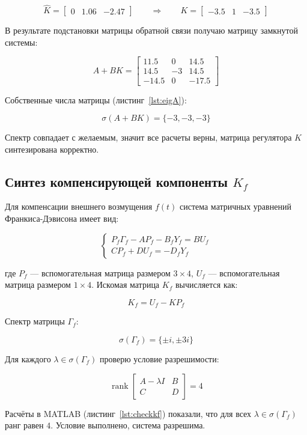 \documentclass[a4paper,12pt]{article}
\begin{document}
	\[
	\hat K =
	\begin{bmatrix}
		0 & 1.06 & -2.47
	\end{bmatrix}
	\qquad \Longrightarrow \qquad	
	K =
	\begin{bmatrix}
		-3.5 & 1 & -3.5
	\end{bmatrix}
	\]
	
	В результате подстановки матрицы обратной связи получаю матрицу замкнутой системы:
	
	\[
	A + BK =
	\begin{bmatrix}
		11.5 & 0 & 14.5 \\
		14.5 & -3 & 14.5 \\
		-14.5 & 0 & -17.5
	\end{bmatrix}
	\]
	
	Собственные числа матрицы (листинг~\ref{lst:eigA}):
	
	\[
	\sigma(A + BK) = \{-3, -3, -3\}
	\]
	
	Спектр совпадает с желаемым, значит все расчеты верны, матрица регулятора \(K\) синтезирована корректно. 
	
\subsection{Синтез компенсирующей компоненты \(K_f\)}

Для компенсации внешнего возмущения \(f(t)\) система матричных уравнений Франкиса-Дэвисона имеет вид:

\[
\begin{cases}
	P_f \Gamma_f - A P_f - B_f Y_f = B U_f \\
	C P_f + D U_f = -D_f Y_f
\end{cases}
\]

где \(P_f\) — вспомогательная матрица размером \(3 \times 4\),
\(U_f\) — вспомогательная матрица размером \(1 \times 4\).
Искомая матрица \(K_f\) вычисляется как:

\[
K_f = U_f - K P_f
\]

Спектр матрицы \(\Gamma_f\):

\[
\sigma(\Gamma_f) = \{\pm i, \pm 3i\}
\]

Для каждого \(\lambda \in \sigma(\Gamma_f)\) проверю условие разрешимости:

\[
\operatorname{rank}
\begin{bmatrix}
	A - \lambda I & B \\
	C & D
\end{bmatrix}
= 4
\]

Расчёты в MATLAB (листинг~\ref{lst:checkkf}) показали, что для всех 
\(\lambda \in \sigma(\Gamma_f)\) ранг равен \(4\). Условие выполнено, система разрешима.
\end{document}
